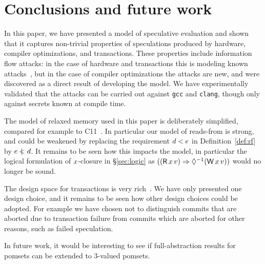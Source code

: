 \section{Conclusions and future work}

In this paper, we have presented a model of speculative evaluation and
shown that it captures non-trivial properties of speculations produced
by hardware, compiler optimizations, and transactions. These properties
include information flow attacks: in the case of hardware and transactions
this is modeling known attacks~\cite{DBLP:journals/corr/abs-1801-01203,DBLP:conf/uss/DisselkoenKPT17},
but in the case of compiler optimizations the attacks are new, and were
discovered as a direct result of developing the model. We have experimentally
validated that the attacks can be carried out against \verb|gcc| and \verb|clang|,
though only against secrets known at compile time.

The model of relaxed memory used in this paper is deliberately
simplified, compared for example to
C11~\cite{Boehm:2008:FCC:1375581.1375591,Batty:2011:MCC:1926385.1926394}.
In particular our model of reads-from is strong, and could be weakened
by replacing the requirement $d<e$ in Definition~\ref{def:rf}
by $e\mathrel{\,\mid\!\!\!<}d$. It remains to be seen how this impacts the model,
in particular the logical formulation of $x$-closure in
\S\ref{sec:logic} as
$((\DR{\aLoc}{\aVal}) \Rightarrow \once(\DW{\aLoc}{\aVal}))$
would no longer be sound.

The design space for transactions is very rich~\cite{DBLP:journals/pacmpl/DongolJR18}.
We have only presented one design choice, and it remains to be seen how other
design choices could be adopted. For example we have chosen not to distinguish
commits that are aborted due to transaction failure from commits which are aborted
for other reasons, such as failed speculation.

In future work, it would be interesting to see if full-abstraction
results for pomsets \cite{Plotkin:1997:TSP:266557.266600} can be extended to
3-valued pomsets.

